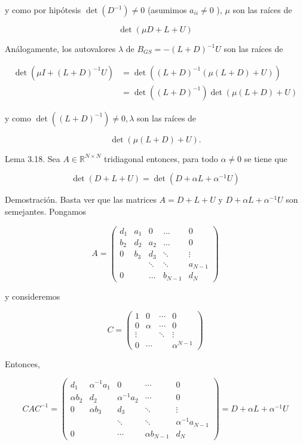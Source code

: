 \documentclass[10pt]{article}
\begin{document}
y como por hipótesis $\operatorname{det}\left(D^{-1}\right) \neq 0$ (asumimos $a_{i i} \neq 0$ ), $\mu$ son las raíces de

$$
\operatorname{det}(\mu D+L+U)
$$

Análogamente, los autovalores $\lambda$ de $B_{G S}=-(L+D)^{-1} U$ son las raíces de

$$
\begin{aligned}
\operatorname{det}\left(\mu I+(L+D)^{-1} U\right) & =\operatorname{det}\left((L+D)^{-1}(\mu(L+D)+U)\right) \\
& =\operatorname{det}\left((L+D)^{-1}\right) \operatorname{det}(\mu(L+D)+U)
\end{aligned}
$$

y como $\operatorname{det}\left((L+D)^{-1}\right) \neq 0, \lambda$ son las raíces de

$$
\operatorname{det}(\mu(L+D)+U) .
$$

Lema 3.18. Sea $A \in \mathbb{R}^{N \times N}$ tridiagonal entonces, para todo $\alpha \neq 0$ se tiene que

$$
\operatorname{det}(D+L+U)=\operatorname{det}\left(D+\alpha L+\alpha^{-1} U\right)
$$

Demostración. Basta ver que las matrices $A=D+L+U$ y $D+\alpha L+\alpha^{-1} U$ son semejantes. Pongamos

$$
A=\left(\begin{array}{ccccc}
d_{1} & a_{1} & 0 & \ldots & 0 \\
b_{2} & d_{2} & a_{2} & \ldots & 0 \\
0 & b_{3} & d_{3} & \ddots & \vdots \\
& & \ddots & \ddots & a_{N-1} \\
0 & & \ldots & b_{N-1} & d_{N}
\end{array}\right)
$$

y consideremos

$$
C=\left(\begin{array}{cccc}
1 & 0 & \cdots & 0 \\
0 & \alpha & \cdots & 0 \\
\vdots & & \ddots & \vdots \\
0 & \cdots & & \alpha^{N-1}
\end{array}\right)
$$

Entonces,

$$
C A C^{-1}=\left(\begin{array}{ccccc}
d_{1} & \alpha^{-1} a_{1} & 0 & \cdots & 0 \\
\alpha b_{2} & d_{2} & \alpha^{-1} a_{2} & \cdots & 0 \\
0 & \alpha b_{3} & d_{3} & \ddots & \vdots \\
& & \ddots & \ddots & \alpha^{-1} a_{N-1} \\
0 & & \cdots & \alpha b_{N-1} & d_{N}
\end{array}\right)=D+\alpha L+\alpha^{-1} U
$$
\end{document}

